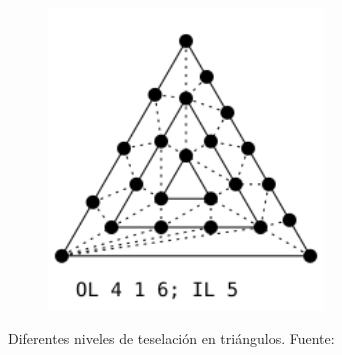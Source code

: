 \begin{figure}
\begin{subfigure}{0.45\textwidth}
	\end{subfigure}
	\hfill
	\begin{subfigure}{0.45\textwidth}
			\includegraphics[height=8cm,width=\textwidth]{figures/TriFull.png}	
	\end{subfigure}
	\caption[Diferentes niveles de teselación en triángulos.]{Diferentes niveles de teselación en triángulos.
	Fuente:~\cite{TessellationImages}}
	\label{fig:triangletessellation}
\end{figure}

